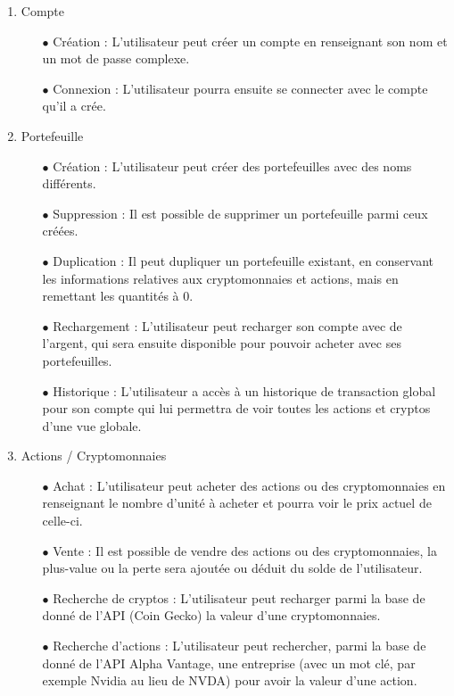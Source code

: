 \documentclass[12pt]{article}
\begin{document}
\begin{enumerate}
    \item Compte \begin{enumerate}
        \item [\tiny$\bullet$] Création : L'utilisateur peut créer un compte en renseignant son nom et un mot de passe complexe.
        \item [\tiny$\bullet$] Connexion : L'utilisateur pourra ensuite se connecter avec le compte qu'il a crée.
    \end{enumerate}
    \item Portefeuille\begin{enumerate}
        \item [\tiny$\bullet$] Création : L'utilisateur peut créer des portefeuilles avec des noms différents.
        \item [\tiny$\bullet$] Suppression : Il est possible de supprimer un portefeuille parmi ceux créées.
        \item [\tiny$\bullet$] Duplication : Il peut dupliquer un portefeuille existant, en conservant les informations relatives aux cryptomonnaies et actions, mais en remettant les quantités à 0.
        \item [\tiny$\bullet$] Rechargement : L'utilisateur peut recharger son compte avec de l'argent, qui sera ensuite disponible pour pouvoir acheter avec ses portefeuilles.
        \item [\tiny$\bullet$] Historique : L'utilisateur a accès à un historique de transaction global pour son compte qui lui permettra de voir toutes les actions et cryptos d'une vue globale.
    \end{enumerate}
    \item Actions / Cryptomonnaies \begin{enumerate}
        \item [\tiny$\bullet$] Achat : L'utilisateur peut acheter des actions ou des cryptomonnaies en renseignant le nombre d'unité à acheter et pourra voir le prix actuel de celle-ci. 
        \item [\tiny$\bullet$]Vente : Il est possible de vendre des actions ou des cryptomonnaies, la plus-value ou la perte sera ajoutée ou déduit du solde de l'utilisateur.
        \item [\tiny$\bullet$] Recherche de cryptos : L'utilisateur peut recharger parmi la base de donné de l'API (Coin Gecko) la valeur d'une cryptomonnaies. 
        \item [\tiny$\bullet$] Recherche d'actions : L'utilisateur peut rechercher, parmi la base de donné de l'API Alpha Vantage, une entreprise (avec un mot clé, par exemple Nvidia au lieu de NVDA) pour avoir la valeur d'une action.

\end{enumerate}
\end{enumerate}
\end{document}
